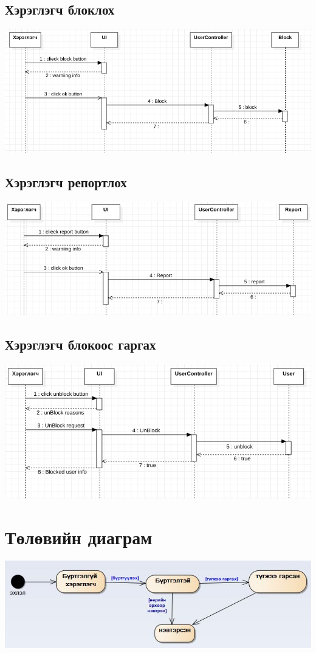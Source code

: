 \documentclass[
oneside, %
english, %
onehalfspacing, %
nolistspacing, %
headsepline, %
]{article} %
\begin{document}
     \subsection{Хэрэглэгч блоклох}
     \includegraphics[width=\textwidth]{block1}
     \subsection{Хэрэглэгч репортлох}
     \includegraphics[width=\textwidth]{report1}
     \subsection{Хэрэглэгч блокоос гаргах}
     \includegraphics[width=\textwidth]{unblock1}
     
      \section{Төлөвийн диаграм }
     \includegraphics[width=\textwidth]{statechartDiagram}
     
\end{document}
